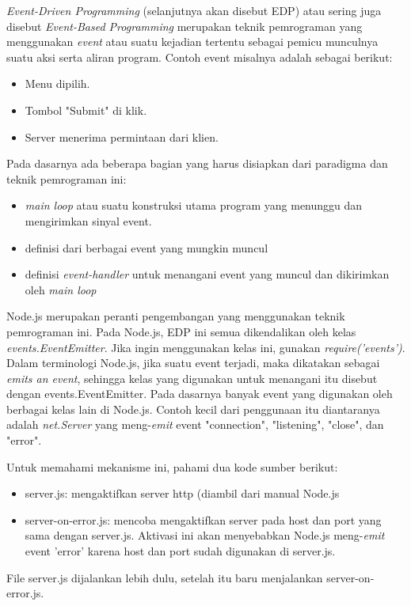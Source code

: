 \textit{Event-Driven Programming} (selanjutnya akan disebut EDP) atau sering juga disebut \textit{Event-Based Programming} merupakan teknik pemrograman yang menggunakan \textit{event} atau suatu kejadian tertentu sebagai pemicu munculnya suatu aksi serta aliran program. Contoh event misalnya adalah sebagai berikut:
\begin{itemize}
	\item Menu dipilih.
	\item Tombol "Submit" di klik.
	\item Server menerima permintaan dari klien.
\end{itemize}
Pada dasarnya ada beberapa bagian yang harus disiapkan dari paradigma dan teknik pemrograman ini:
\begin{itemize}
	\item \textit{main loop} atau suatu konstruksi utama program yang menunggu dan mengirimkan sinyal event.
	\item definisi dari berbagai event yang mungkin muncul
	\item definisi \textit{event-handler} untuk menangani event yang muncul dan dikirimkan oleh \textit{main loop}
\end{itemize}
Node.js merupakan peranti pengembangan yang menggunakan teknik pemrograman ini. Pada Node.js, EDP ini semua dikendalikan oleh kelas \textit{events.EventEmitter}. Jika ingin menggunakan kelas ini, gunakan \textit{require('events')}. Dalam terminologi Node.js, jika suatu event terjadi, maka dikatakan sebagai \textit{emits an event}, sehingga kelas yang digunakan untuk menangani itu disebut dengan events.EventEmitter. Pada dasarnya banyak event yang digunakan oleh berbagai kelas lain di Node.js. Contoh kecil dari penggunaan itu diantaranya adalah \textit{net.Server} yang meng-\textit{emit} event "connection", "listening", "close", dan "error".

Untuk memahami mekanisme ini, pahami dua kode sumber berikut:
\begin{itemize}
	\item server.js: mengaktifkan server http (diambil dari manual Node.js
	\item server-on-error.js: mencoba mengaktifkan server pada host dan port yang sama dengan server.js. Aktivasi ini akan menyebabkan Node.js meng-\textit{emit} event 'error' karena host dan port sudah digunakan di server.js.
\end{itemize}
File server.js dijalankan lebih dulu, setelah itu baru menjalankan server-on-error.js.


